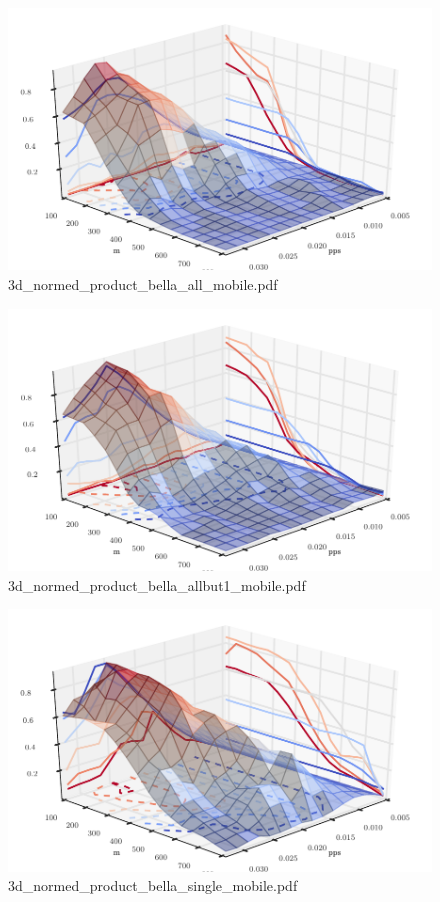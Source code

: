 \documentclass{article}
\begin{document}
\begin{figure}[h!]
\centering
\includegraphics[width=\linewidth]{3d_normed_product_bella_all_mobile.pdf}
\caption{3d\_normed\_product\_bella\_all\_mobile.pdf}
\end{figure}




\begin{figure}[h!]
\centering
\includegraphics[width=\linewidth]{3d_normed_product_bella_allbut1_mobile.pdf}
\caption{3d\_normed\_product\_bella\_allbut1\_mobile.pdf}
\end{figure}




\begin{figure}[h!]
\centering
\includegraphics[width=\linewidth]{3d_normed_product_bella_single_mobile.pdf}
\caption{3d\_normed\_product\_bella\_single\_mobile.pdf}
\end{figure}
\end{document}

